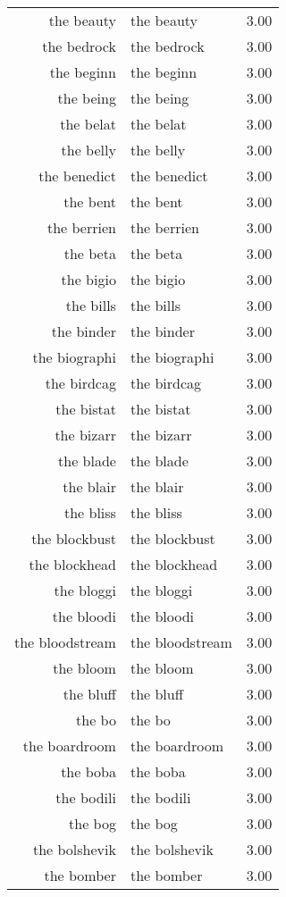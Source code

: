\begin{table}[ht]
\begin{tabular}{rlr}
  the beauty & the beauty & 3.00 \\ 
  the bedrock & the bedrock & 3.00 \\ 
  the beginn & the beginn & 3.00 \\ 
  the being & the being & 3.00 \\ 
  the belat & the belat & 3.00 \\ 
  the belly & the belly & 3.00 \\ 
  the benedict & the benedict & 3.00 \\ 
  the bent & the bent & 3.00 \\ 
  the berrien & the berrien & 3.00 \\ 
  the beta & the beta & 3.00 \\ 
  the bigio & the bigio & 3.00 \\ 
  the bills & the bills & 3.00 \\ 
  the binder & the binder & 3.00 \\ 
  the biographi & the biographi & 3.00 \\ 
  the birdcag & the birdcag & 3.00 \\ 
  the bistat & the bistat & 3.00 \\ 
  the bizarr & the bizarr & 3.00 \\ 
  the blade & the blade & 3.00 \\ 
  the blair & the blair & 3.00 \\ 
  the bliss & the bliss & 3.00 \\ 
  the blockbust & the blockbust & 3.00 \\ 
  the blockhead & the blockhead & 3.00 \\ 
  the bloggi & the bloggi & 3.00 \\ 
  the bloodi & the bloodi & 3.00 \\ 
  the bloodstream & the bloodstream & 3.00 \\ 
  the bloom & the bloom & 3.00 \\ 
  the bluff & the bluff & 3.00 \\ 
  the bo & the bo & 3.00 \\ 
  the boardroom & the boardroom & 3.00 \\ 
  the boba & the boba & 3.00 \\ 
  the bodili & the bodili & 3.00 \\ 
  the bog & the bog & 3.00 \\ 
  the bolshevik & the bolshevik & 3.00 \\ 
  the bomber & the bomber & 3.00 \\ 

\end{tabular}
\end{table}
